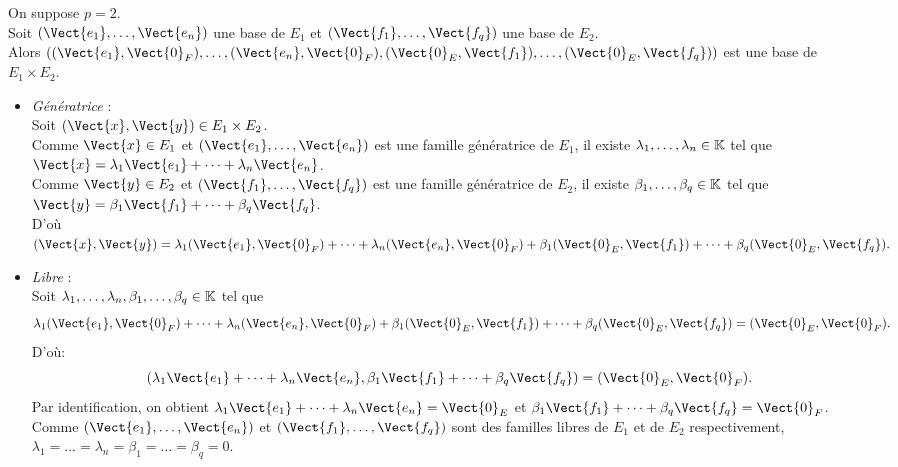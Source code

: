 \documentclass{book}
\begin{document}
\begin{Demonstration}
On suppose $p=2$.\\
Soit $(\Vect{e_1},\dots,\Vect{e_n})$ une base de $E_1$ et $(\Vect{f_1},\dots,\Vect{f_q})$ une base de $E_2$.\\
Alors $( (\Vect{e_1},\Vect{0}_F),\dots,(\Vect{e_n},\Vect{0}_F),(\Vect{0}_E,\Vect{f_1}),\dots,(\Vect{0}_E,\Vect{f_q}))$ est une base de $E_1\times E_2.$
\begin{itemize}
\item \textit{Génératrice} :\\
Soit $(\Vect{x},\Vect{y})\in E_1\times E_2$. \\
Comme $\Vect{x}\in E_1$ et $(\Vect{e_1},\dots,\Vect{e_n})$ est une famille génératrice de $E_1$, il existe $\lambda_1,\dots,\lambda_n\in \mathbb{K}$ tel que $\Vect{x}=\lambda_1\Vect{e_1}+\dots+ \lambda_n\Vect{e_n}$.\\
Comme $\Vect{y}\in E_2$ et $(\Vect{f_1},\dots,\Vect{f_q})$ est une famille génératrice de $E_2$, il existe $\beta_1,\dots,\beta_q\in \mathbb{K}$ tel que $\Vect{y}=\beta_1\Vect{f_1}+\dots+ \beta_q\Vect{f_q}$.\\
D'où $(\Vect{x},\Vect{y})=\lambda_1(\Vect{e_1},\Vect{0}_F)+\dots+\lambda_n(\Vect{e_n},\Vect{0}_F)+ \beta_1(\Vect{0}_E,\Vect{f_1})+\dots+\beta_q(\Vect{0}_E,\Vect{f_q}).$
\item \textit{Libre} :\\
Soit  $\lambda_1,\dots,\lambda_n,\beta_1,\dots,\beta_q\in \mathbb{K}$ tel que $$\lambda_1(\Vect{e_1},\Vect{0}_F)+\dots+\lambda_n(\Vect{e_n},\Vect{0}_F)+ \beta_1(\Vect{0}_E,\Vect{f_1})+\dots+\beta_q(\Vect{0}_E,\Vect{f_q})=(\Vect{0}_E,\Vect{0}_F).$$
D'où:
$$(\lambda_1\Vect{e_1}+\dots+ \lambda_n\Vect{e_n},\beta_1\Vect{f_1}+\dots+ \beta_q\Vect{f_q} )=(\Vect{0}_E,\Vect{0}_F).$$
Par identification, on obtient $\lambda_1\Vect{e_1}+\dots+ \lambda_n\Vect{e_n}=\Vect{0}_E$ et $\beta_1\Vect{f_1}+\dots+ \beta_q\Vect{f_q}=\Vect{0}_F$. Comme $(\Vect{e_1},\dots,\Vect{e_n})$ et $(\Vect{f_1},\dots,\Vect{f_q})$ sont des familles libres de $E_1$ et  de $E_2$ respectivement, $\lambda_1=\dots=\lambda_n=\beta_1=\dots=\beta_q=0$. 
\end{itemize}
\end{Demonstration}
\end{document}
